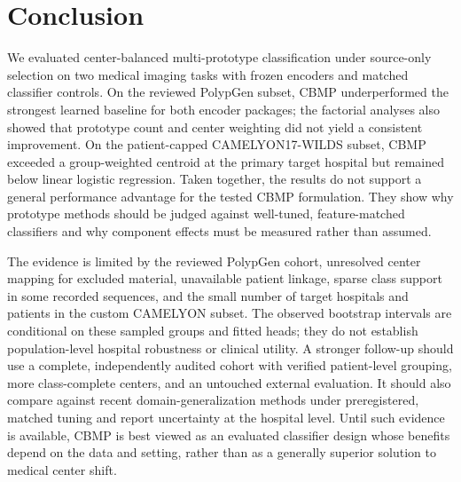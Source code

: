 \section{Conclusion}
\label{sec:conclusion}

We evaluated center-balanced multi-prototype classification under source-only selection on two medical imaging tasks with frozen encoders and matched classifier controls. On the reviewed PolypGen subset, CBMP underperformed the strongest learned baseline for both encoder packages; the factorial analyses also showed that prototype count and center weighting did not yield a consistent improvement. On the patient-capped CAMELYON17-WILDS subset, CBMP exceeded a group-weighted centroid at the primary target hospital but remained below linear logistic regression. Taken together, the results do not support a general performance advantage for the tested CBMP formulation. They show why prototype methods should be judged against well-tuned, feature-matched classifiers and why component effects must be measured rather than assumed.

The evidence is limited by the reviewed PolypGen cohort, unresolved center mapping for excluded material, unavailable patient linkage, sparse class support in some recorded sequences, and the small number of target hospitals and patients in the custom CAMELYON subset. The observed bootstrap intervals are conditional on these sampled groups and fitted heads; they do not establish population-level hospital robustness or clinical utility. A stronger follow-up should use a complete, independently audited cohort with verified patient-level grouping, more class-complete centers, and an untouched external evaluation. It should also compare against recent domain-generalization methods under preregistered, matched tuning and report uncertainty at the hospital level. Until such evidence is available, CBMP is best viewed as an evaluated classifier design whose benefits depend on the data and setting, rather than as a generally superior solution to medical center shift.
